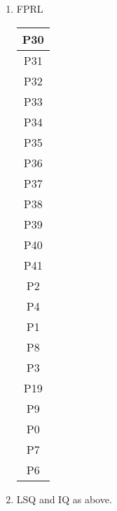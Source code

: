 \documentclass[12pt,letterpaper,twoside]{hmcpset}
\begin{document}
\begin{solution}
 \begin{enumerate}
  \item FPRL
  
  \begin{tabular}{|c|}
\hline
P30 \\ \hline P31 \\ \hline P32 \\ \hline P33 \\ \hline P34 \\ \hline P35 \\ \hline P36 \\ \hline P37 \\ \hline P38 \\ \hline P39 \\ \hline P40 \\ \hline P41 \\ \hline P2 \\ \hline P4 \\ \hline P1 \\ \hline P8 \\ \hline P3 \\ \hline P19 \\ \hline P9 \\ \hline P0 \\ \hline P7\\ \hline P6 \\ \hline 
  \end{tabular}
  
  \item LSQ and IQ as above.
 \end{enumerate}

\end{solution}
\end{document}
